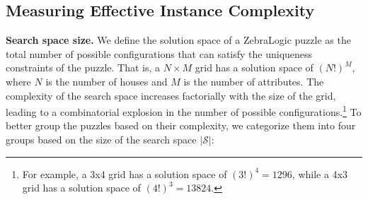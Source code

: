 \subsection{Measuring Effective Instance Complexity}
\label{ssec:complexity_metrics}

\textbf{Search space size.} 
We define the solution space of a ZebraLogic puzzle as the total number of possible configurations that can satisfy the uniqueness constraints of the puzzle. That is, a $N \times M$ grid has a solution space of $(N!)^M$, where $N$ is the number of houses and $M$ is the number of attributes. The complexity of the search space increases factorially with the size of the grid, leading to a combinatorial explosion in the number of possible configurations.\footnote{For example, a 3x4 grid has a solution space of $(3!)^4 = 1296$, while a 4x3 grid has a solution space of $(4!)^3 = 13824$.}
To better group the puzzles based on their complexity, we categorize them into four groups based on the size of the search space $|\mathcal{S}|$:

